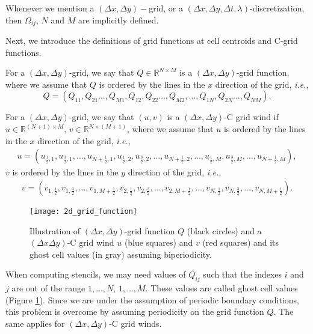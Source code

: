 \begin{remark}
	Whenever we mention a $(\Delta x,\Delta y)-$grid, or a $(\Delta x,\Delta y,\Delta t, \lambda)$-discretization,
	then $\Omega_{ij}$, $N$ and $M$ are implicitly defined.
\end{remark}
Next, we introduce the definitions of grid functions at cell centroids and C-grid functions. 
\begin{definition}
	\label{chp2-rmk-2d-gridfunction1}
	For a $(\Delta x,\Delta y)$-grid, we say that $Q \in \mathbb{R}^{N\times M}$ is a 
	$(\Delta x,\Delta y)$-grid function, where we assume that $Q$ is ordered by
	the lines in the $x$ direction of the grid, \textit{i.e.},
	\begin{equation*}
		Q = (Q_{11}, Q_{21} \ldots, Q_{M1}, Q_{12}, Q_{22} \ldots, Q_{M2}, \ldots,  Q_{1N}, Q_{2N} \ldots, Q_{NM}).
	\end{equation*}
\end{definition}
\begin{definition}
	\label{chp2-rmk-2d-gridfunction2}
	For a $(\Delta x,\Delta y)$-grid, we say that $(u,v)$ is a $(\Delta x,\Delta y)$-C grid wind if 
	$u \in \mathbb{R}^{(N+1) \times M}$, $v \in \mathbb{R}^{N \times (M+1)}$, where we assume that $u$ is ordered by
	the lines in the $x$ direction of the grid, \textit{i.e.},
	\begin{align*}
	u = (u_{\frac{1}{2},1}, u_{\frac{3}{2},1}, \ldots, u_{N+\frac{1}{2},1}, u_{\frac{1}{2},2}, u_{\frac{3}{2},2}, \ldots, u_{N+\frac{1}{2},2}, \ldots ,
	u_{\frac{1}{2},M}, u_{\frac{3}{2},M}, \ldots, u_{N+\frac{1}{2},M}),
	\end{align*}
	$v$ is ordered by the lines in the $y$ direction of the grid, \textit{i.e.},
	\begin{align*}
	v = (v_{1,\frac{1}{2}}, v_{1,\frac{3}{2}}, \ldots, v_{1,M+\frac{1}{2}}, v_{2,\frac{1}{2}}, v_{2,\frac{3}{2}}, \ldots, v_{2,M+\frac{1}{2}}, \ldots ,
	v_{N,\frac{1}{2}}, v_{N,\frac{3}{2}}, \ldots, v_{N,M+\frac{1}{2}}).
\end{align*}
\end{definition}
\begin{figure}[!htb]
	\centering
	\texttt{[image: 2d\_grid\_function]}
	\caption{Illustration of $(\Delta x, \Delta y)$-grid function $Q$ (black circles)
		and a $(\Delta x\Delta y)$-C grid wind $u$ (blue squares) and $v$ (red squares) and its ghost cell
		values (in gray) assuming biperiodicity.\label{chp3-sec1-grid2d-function}}
\end{figure}
When computing stencils, we may need values of $Q_{ij}$ such that the
indexes $i$ and $j$ are out of the range $1,\ldots, N$, $1,\ldots, M$.
These values are called ghost cell values (Figure \ref{chp3-sec1-grid2d-function}).
Since we are under the assumption of periodic boundary conditions, this problem
is overcome by assuming periodicity on the grid function $Q$. 
The same applies for $(\Delta x,\Delta y)$-C grid winds.


